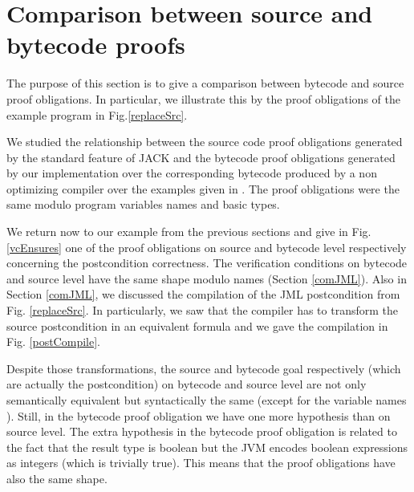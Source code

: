 
\section{Comparison between source and bytecode proofs}  \label{results}

The purpose of this section is to give a comparison between bytecode and source proof obligations.
In particular, we illustrate this by the proof obligations of the example program in Fig.\ref{replaceSrc}.

We studied the relationship between the source code proof obligations generated 
by the standard feature of JACK and the bytecode proof obligations generated by our implementation over the corresponding bytecode
 produced by a non optimizing compiler over the examples given in \cite{JPVC03JKM}. The proof obligations were the same modulo 
program variables names and basic types.

 We return now to our example from the previous sections and give in Fig. \ref{vcEnsures} one of the proof obligations on source 
and bytecode level respectively concerning the postcondition correctness. The verification conditions on bytecode and source level
 have the same shape modulo names (Section \ref{comJML}). Also in Section
 \ref{comJML}, we discussed the compilation of the JML postcondition from Fig. \ref{replaceSrc}. In particularly,
 we saw that the compiler has to transform the source postcondition in an equivalent formula and we
 gave the compilation in Fig. \ref{postCompile}. 

Despite those transformations, the source and bytecode goal respectively (which are actually the postcondition) on bytecode and source level are not only
semantically equivalent but syntactically the same (except for the variable names ). Still, in the bytecode proof obligation we have one more hypothesis than on source level. The extra hypothesis in the bytecode proof obligation is related to the fact that the result type is boolean but the JVM encodes boolean expressions as integers (which is trivially true). This means that the proof obligations have also the same shape.

